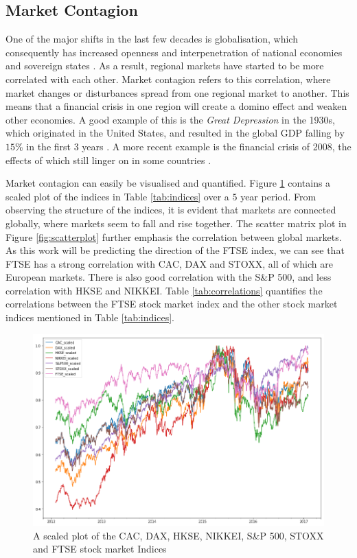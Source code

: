 \documentclass{UoYCSproject}
\begin{document}
\subsection{Market Contagion}
One of the major shifts in the last few decades is globalisation, which consequently has increased openness and interpenetration of national economies and sovereign states \cite{scott1999regions}. As a result, regional markets have started to be more correlated with each other. Market contagion refers to this correlation, where market changes or disturbances spread from one regional market to another. This means that a financial crisis in one region will create a domino effect and weaken other economies. A good example of this is the \textit{Great Depression} in the 1930s, which originated in the United States, and resulted in the global GDP falling by $15$\% in the first $3$ years \cite{rogerhistoryrepeating}. A more recent example is the financial crisis of 2008, the effects of which still linger on in some countries \cite{2008crisis}.  

Market contagion can easily be visualised and quantified. Figure \ref{fig:stockindexplot} contains a scaled plot of the indices in Table \ref{tab:indices} over a $5$ year period. From observing the structure of the indices, it is evident that markets are connected globally, where markets seem to fall and rise together. The scatter matrix plot in Figure \ref{fig:scatterplot} further emphasis the correlation between global markets. As this work will be predicting the direction of the FTSE index, we can see that FTSE has a strong correlation with CAC, DAX and STOXX, all of which are European markets. There is also good correlation with the S\&P 500, and less correlation with HKSE and NIKKEI. Table \ref{tab:correlations} quantifies the correlations between the FTSE stock market index and the other stock market indices mentioned in Table \ref{tab:indices}. 

\begin{figure}[h]
\includegraphics[width=12cm]{scaled_plot_of_indices}
\centering
\caption{A scaled plot of the CAC, DAX, HKSE, NIKKEI, S\&P 500, STOXX and FTSE stock market Indices} 
\label{fig:stockindexplot}
\end{figure}
\end{document}
